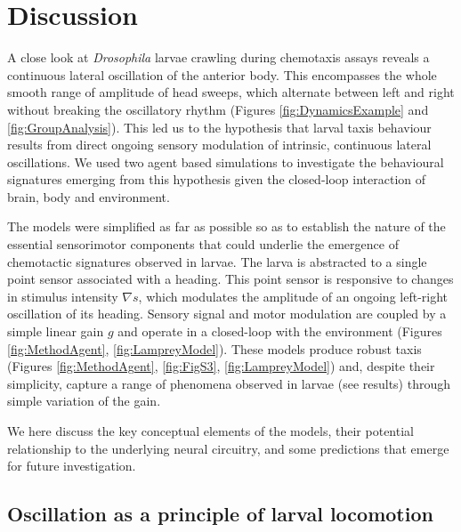 \documentclass[11pt,a4paper]{article}
\newcommand{\Dros }{\emph{Drosophila }}
\newcommand{\todoBW}[1]{\todo[author=BW,color=orange, size=\tiny,inline]{#1}}
\begin{document}
\section{Discussion}
A close look at \Dros larvae crawling during chemotaxis assays reveals a continuous lateral oscillation of the anterior body. This encompasses the whole smooth range of amplitude of head sweeps, which alternate between left and right without breaking the oscillatory rhythm (Figures \ref{fig:DynamicsExample} and \ref{fig:GroupAnalysis}). 
This led us to the hypothesis that larval taxis behaviour results from direct ongoing sensory modulation of intrinsic, continuous lateral oscillations. We used two agent based simulations to investigate the behavioural signatures emerging from this hypothesis given the closed-loop interaction of brain, body and environment.
 
The models were simplified as far as possible so as to establish the nature of the essential sensorimotor components that could underlie the emergence of chemotactic signatures observed in larvae.
The larva is abstracted to a single point sensor associated with a heading. This point sensor is responsive to changes in stimulus intensity $\nabla s$, which modulates the amplitude of an ongoing left-right oscillation of its heading. Sensory signal and motor modulation are coupled by a simple linear gain $g$ and operate in a closed-loop with the environment (Figures \ref{fig:MethodAgent}, \ref{fig:LampreyModel}). 
These models produce robust taxis (Figures \ref{fig:MethodAgent}, \ref{fig:FigS3}, \ref{fig:LampreyModel}) and, despite their simplicity, capture a range of phenomena observed in larvae (see results) through simple variation of the gain.

 We here discuss the key conceptual elements of the models, their potential relationship to the underlying neural circuitry, and some predictions that emerge for future investigation.


\subsection{Oscillation as a principle of larval locomotion}
\end{document}

